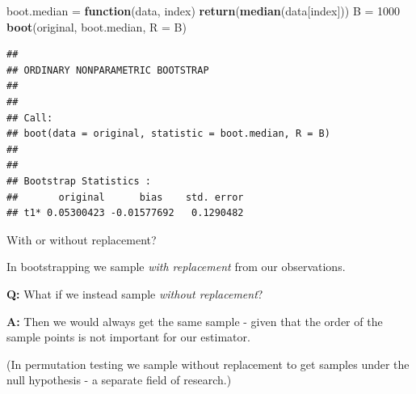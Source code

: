 \documentclass[10pt,ignorenonframetext,]{beamer}
\newenvironment{Shaded}{\begin{snugshade}}{\end{snugshade}}
\newcommand{\KeywordTok}[1]{\textcolor[rgb]{0.13,0.29,0.53}{\textbf{#1}}}
\newcommand{\DataTypeTok}[1]{\textcolor[rgb]{0.13,0.29,0.53}{#1}}
\newcommand{\DecValTok}[1]{\textcolor[rgb]{0.00,0.00,0.81}{#1}}
\newcommand{\StringTok}[1]{\textcolor[rgb]{0.31,0.60,0.02}{#1}}
\newcommand{\ControlFlowTok}[1]{\textcolor[rgb]{0.13,0.29,0.53}{\textbf{#1}}}
\newcommand{\NormalTok}[1]{#1}
\begin{document}
\begin{frame}[fragile]

\begin{Shaded}
\begin{Highlighting}[]
\NormalTok{boot.median =}\StringTok{ }\ControlFlowTok{function}\NormalTok{(data, index) }\KeywordTok{return}\NormalTok{(}\KeywordTok{median}\NormalTok{(data[index]))}
\NormalTok{B =}\StringTok{ }\DecValTok{1000}
\KeywordTok{boot}\NormalTok{(original, boot.median, }\DataTypeTok{R =}\NormalTok{ B)}
\end{Highlighting}
\end{Shaded}

\begin{verbatim}
## 
## ORDINARY NONPARAMETRIC BOOTSTRAP
## 
## 
## Call:
## boot(data = original, statistic = boot.median, R = B)
## 
## 
## Bootstrap Statistics :
##       original      bias    std. error
## t1* 0.05300423 -0.01577692   0.1290482
\end{verbatim}

\end{frame}

\begin{frame}

\begin{block}{With or without replacement?}

In bootstrapping we sample \emph{with replacement} from our
observations.

\textbf{Q:} What if we instead sample \emph{without replacement}?

\textbf{A:} Then we would always get the same sample - given that the
order of the sample points is not important for our estimator.

(In permutation testing we sample without replacement to get samples
under the null hypothesis - a separate field of research.)

\end{block}

\end{frame}
\end{document}
